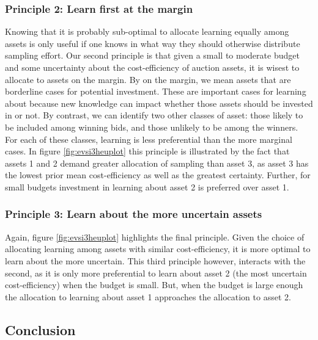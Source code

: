 \documentclass[]{article}
\theoremstyle{definition}
\theoremstyle{definition}
\theoremstyle{remark}
\begin{document}
\subsubsection*{Principle 2: Learn first at the
margin}\label{principle-2-learn-first-at-the-margin}

Knowing that it is probably sub-optimal to allocate learning equally
among assets is only useful if one knows in what way they should
otherwise distribute sampling effort. Our second principle is that given
a small to moderate budget and some uncertainty about the
cost-efficiency of auction assets, it is wisest to allocate to assets on
the margin. By on the margin, we mean assets that are borderline cases
for potential investment. These are important cases for learning about
because new knowledge can impact whether those assets should be invested
in or not. By contrast, we can identify two other classes of asset:
those likely to be included among winning bids, and those unlikely to be
among the winners. For each of these classes, learning is less
preferential than the more marginal cases. In figure
\ref{fig:evsi3heuplot} this principle is illustrated by the fact that
assets 1 and 2 demand greater allocation of sampling than asset 3, as
asset 3 has the lowest prior mean cost-efficiency as well as the
greatest certainty. Further, for small budgets investment in learning
about asset 2 is preferred over asset 1.

\subsubsection*{Principle 3: Learn about the more uncertain
assets}\label{principle-3-learn-about-the-more-uncertain-assets}

Again, figure \ref{fig:evsi3heuplot} highlights the final principle.
Given the choice of allocating learning among assets with similar
cost-efficiency, it is more optimal to learn about the more uncertain.
This third principle however, interacts with the second, as it is only
more preferential to learn about asset 2 (the most uncertain
cost-efficiency) when the budget is small. But, when the budget is large
enough the allocation to learning about asset 1 approaches the
allocation to asset 2.

\subsection*{Conclusion}\label{conclusion}
\end{document}
